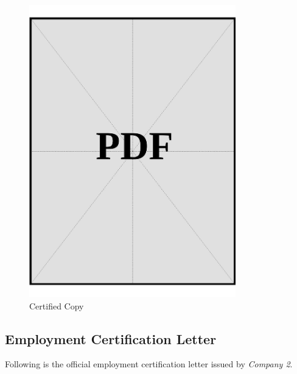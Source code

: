 \begin{figure}[ht]
  \centering
  \includegraphics[page=1, width=0.8\textwidth]{../application-docs/applicant/employment/company-2/insurance-records/certified-copies.pdf}
  \caption{Certified Copy}
  \label{pdf:company-2-insurance-certified-copy}
\end{figure}
\vspace*{\fill}

\clearpage

\subsection*{Employment Certification Letter}\label{ssec:company-2-certificate}


Following is the official employment certification letter issued by \textit{Company 2}.

